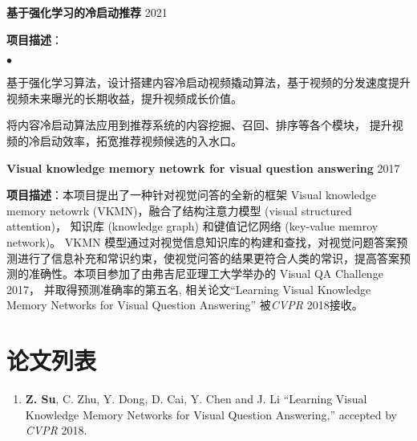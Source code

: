 \documentclass[margin,line]{res}
\newenvironment{list2}{
  \begin{list}{$\bullet$}{%
      \setlength{\itemsep}{0in}
      \setlength{\parsep}{0in} \setlength{\parskip}{0in}
      \setlength{\topsep}{0in} \setlength{\partopsep}{0in}
      \setlength{\leftmargin}{0.2in}}}{\end{list}}
\begin{document}
\begin{resume}
	\textbf{基于强化学习的冷启动推荐} \hfill{2021}
	\begin{description}
		\item \textbf{项目描述}：
		      \begin{list2}
			      \item 基于强化学习算法，设计搭建内容冷启动视频撬动算法，基于视频的分发速度提升视频未来曝光的长期收益，提升视频成长价值。
			      \item 将内容冷启动算法应用到推荐系统的内容挖掘、召回、排序等各个模块， 提升视频的冷启动效率，拓宽推荐视频候选的入水口。
		      \end{list2}
	\end{description}

	\textbf{Visual knowledge memory netowrk for visual question answering} \hfill{2017}
	\begin{description}
		\item \textbf{项目描述}：本项目提出了一种针对视觉问答的全新的框架 Visual knowledge memory netowrk (VKMN)，融合了结构注意力模型 (visual structured attention)， 知识库 (knowledge graph) 和键值记忆网络 (key-value memroy network)。 VKMN 模型通过对视觉信息知识库的构建和查找，对视觉问题答案预测进行了信息补充和常识约束，使视觉问答的结果更符合人类的常识，提高答案预测的准确性。本项目参加了由弗吉尼亚理工大学举办的 Visual QA Challenge 2017， 并取得预测准确率的第五名, 相关论文``Learning Visual Knowledge Memory Networks for Visual Question Answering'' 被\emph{CVPR} 2018接收。
	\end{description}


	\section{\sc 论文列表}
	\begin{enumerate}[leftmargin=*]
		\item \textbf{Z. Su},  C. Zhu, Y. Dong, D. Cai, Y. Chen and J. Li ``Learning Visual Knowledge Memory Networks for Visual Question Answering,'' accepted by \emph{CVPR} 2018.


\end{enumerate}
\end{resume}
\end{document}
